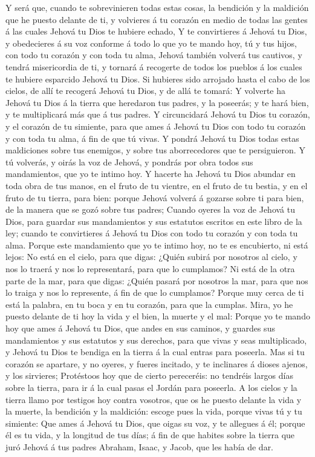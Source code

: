  Y será que, cuando te sobrevinieren todas estas cosas, la
bendición y la maldición que he puesto delante de ti, y volvieres á tu
corazón en medio de todas las gentes á las cuales Jehová tu Dios te
hubiere echado,  Y te convirtieres á Jehová tu Dios, y
obedecieres á su voz conforme á todo lo que yo te mando hoy, tú y tus
hijos, con todo tu corazón y con toda tu alma,  Jehová
también volverá tus cautivos, y tendrá misericordia de ti, y tornará á
recogerte de todos los pueblos á los cuales te hubiere esparcido Jehová
tu Dios.  Si hubieres sido arrojado hasta el cabo de los
cielos, de allí te recogerá Jehová tu Dios, y de allá te tomará:
 Y volverte ha Jehová tu Dios á la tierra que heredaron tus
padres, y la poseerás; y te hará bien, y te multiplicará más que á tus
padres.  Y circuncidará Jehová tu Dios tu corazón, y el
corazón de tu simiente, para que ames á Jehová tu Dios con todo tu
corazón y con toda tu alma, á fin de que tú vivas.  Y pondrá
Jehová tu Dios todas estas maldiciones sobre tus enemigos, y sobre tus
aborrecedores que te persiguieron.  Y tú volverás, y oirás
la voz de Jehová, y pondrás por obra todos sus mandamientos, que yo te
intimo hoy.  Y hacerte ha Jehová tu Dios abundar en toda
obra de tus manos, en el fruto de tu vientre, en el fruto de tu bestia,
y en el fruto de tu tierra, para bien: porque Jehová volverá á gozarse
sobre ti para bien, de la manera que se gozó sobre tus padres;
 Cuando oyeres la voz de Jehová tu Dios, para guardar sus
mandamientos y sus estatutos escritos en este libro de la ley; cuando te
convirtieres á Jehová tu Dios con todo tu corazón y con toda tu alma.
 Porque este mandamiento que yo te intimo hoy, no te es
encubierto, ni está lejos:  No está en el cielo, para que
digas: ¿Quién subirá por nosotros al cielo, y nos lo traerá y nos lo
representará, para que lo cumplamos?  Ni está de la otra
parte de la mar, para que digas: ¿Quién pasará por nosotros la mar, para
que nos lo traiga y nos lo represente, á fin de que lo cumplamos?
 Porque muy cerca de ti está la palabra, en tu boca y en tu
corazón, para que la cumplas.  Mira, yo he puesto delante
de ti hoy la vida y el bien, la muerte y el mal:  Porque yo
te mando hoy que ames á Jehová tu Dios, que andes en sus caminos, y
guardes sus mandamientos y sus estatutos y sus derechos, para que vivas
y seas multiplicado, y Jehová tu Dios te bendiga en la tierra á la cual
entras para poseerla.  Mas si tu corazón se apartare, y no
oyeres, y fueres incitado, y te inclinares á dioses ajenos, y los
sirvieres;  Protéstoos hoy que de cierto pereceréis: no
tendréis largos días sobre la tierra, para ir á la cual pasas el Jordán
para poseerla.  A los cielos y la tierra llamo por testigos
hoy contra vosotros, que os he puesto delante la vida y la muerte, la
bendición y la maldición: escoge pues la vida, porque vivas tú y tu
simiente:  Que ames á Jehová tu Dios, que oigas su voz, y
te allegues á él; porque él es tu vida, y la longitud de tus días; á fin
de que habites sobre la tierra que juró Jehová á tus padres Abraham,
Isaac, y Jacob, que les había de dar.

